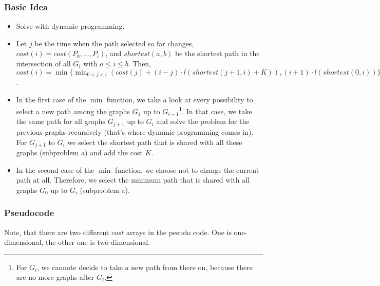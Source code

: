 \documentclass[12pt]{article}
\begin{document}
\subsubsection*{Basic Idea}
\begin{itemize}
	\item Solve with dynamic programming.
	\item Let $j$ be the time when the path selected so far changes, $\mathit{cost}(i) = \mathit{cost}(P_0, \ldots,  P_i)$, and $\mathit{shortest}(a, b)$ be the shortest path in the intersection of all $G_i$ with $a \leq i \leq b$. Then, $\mathit{cost}(i) = \min \{ \min_{0 < j < i} (\mathit{cost}(j) + (i-j) \cdot l(\mathit{shortest}(j+1, i) + K)), (i+1) \cdot l(\mathit{shortest}(0, i)) \}$.
	\item In the first case of the $\min$ function, we take a look at every possibility to select a new path among the graphs $G_1$ up to $G_{i-1}$\footnote{For $G_i$, we cannote decide to take a new path from there on, because there are no more graphs after $G_i$.}. In that case, we take the same path for all graphs $G_{j+1}$ up to $G_i$ and solve the problem for the previous graphs recursively (that's where dynamic programming comes in). For $G_{j+1}$ to $G_i$ we select the shortest path that is shared with all these graphs (subproblem a) and add the cost $K$.
	\item In the second case of the $\min$ function, we choose not to change the current path at all. Therefore, we select the minimum path that is shared with all graphs $G_0$ up to $G_i$ (subproblem a).
\end{itemize}

\subsubsection*{Pseudocode}
Note, that there are two different $\mathit{cost}$ arrays in the pesudo code. One is one-dimensional, the other one is two-dimensional.
\end{document}
